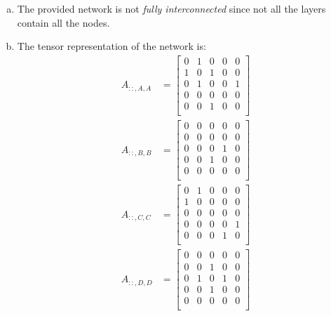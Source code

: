 \documentclass{article}
\begin{document}
\begin{enumerate}[a)]
        \item The provided network is not \textit{fully interconnected} since not all the layers contain all the nodes.
        
        \item The tensor representation of the network is:
        \begin{align*}
            A_{::,A,A} &= 
            \begin{bmatrix}
            0 & 1 & 0 & 0 & 0 \\
            1 & 0 & 1 & 0 & 0 \\
            0 & 1 & 0 & 0 & 1 \\
            0 & 0 & 0 & 0 & 0 \\
            0 & 0 & 1 & 0 & 0 \\
            \end{bmatrix}\\
            A_{::,B,B} &= 
            \begin{bmatrix}
            0 & 0 & 0 & 0 & 0 \\
            0 & 0 & 0 & 0 & 0 \\
            0 & 0 & 0 & 1 & 0 \\
            0 & 0 & 1 & 0 & 0 \\
            0 & 0 & 0 & 0 & 0 \\
            \end{bmatrix}\\
            A_{::,C,C} &= 
            \begin{bmatrix}
            0 & 1 & 0 & 0 & 0 \\
            1 & 0 & 0 & 0 & 0 \\
            0 & 0 & 0 & 0 & 0 \\
            0 & 0 & 0 & 0 & 1 \\
            0 & 0 & 0 & 1 & 0 \\
            \end{bmatrix}\\
            A_{::,D,D} &= 
            \begin{bmatrix}
            0 & 0 & 0 & 0 & 0 \\
            0 & 0 & 1 & 0 & 0 \\
            0 & 1 & 0 & 1 & 0 \\
            0 & 0 & 1 & 0 & 0 \\
            0 & 0 & 0 & 0 & 0 \\
            \end{bmatrix}\\

\end{align*}
\end{enumerate}
\end{document}
